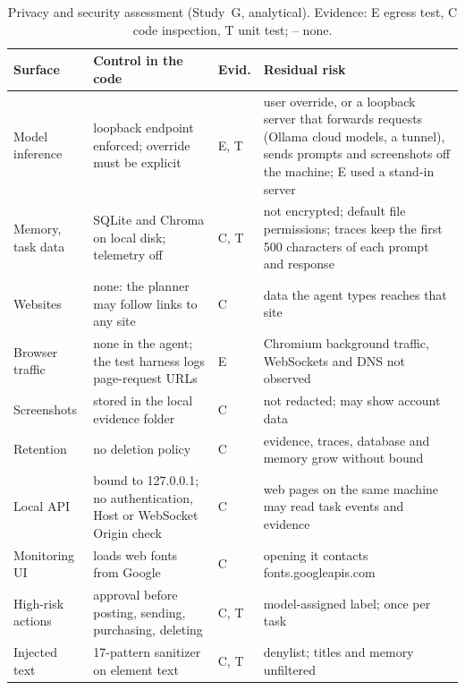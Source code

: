 \begin{table}[t]
\centering
\caption{Privacy and security assessment (Study~G, analytical). Evidence: E egress test, C code inspection, T unit test; -- none.}
\label{tab:threats}
\scriptsize
\setlength{\tabcolsep}{2pt}
\begin{tabular}{@{}p{1.55cm}p{3.05cm}p{0.6cm}p{2.95cm}@{}}
\toprule
Surface & Control in the code & Evid. & Residual risk \\
\midrule
Model inference & loopback endpoint enforced; override must be explicit & E, T & user override, or a loopback server that forwards requests (Ollama cloud models, a tunnel), sends prompts and screenshots off the machine; E used a stand-in server \\
Memory, task data & SQLite and Chroma on local disk; telemetry off & C, T & not encrypted; default file permissions; traces keep the first 500 characters of each prompt and response \\
Websites & none: the planner may follow links to any site & C & data the agent types reaches that site \\
Browser traffic & none in the agent; the test harness logs page-request URLs & E & Chromium background traffic, WebSockets and DNS not observed \\
Screenshots & stored in the local evidence folder & C & not redacted; may show account data \\
Retention & no deletion policy & C & evidence, traces, database and memory grow without bound \\
Local API & bound to 127.0.0.1; no authentication, Host or WebSocket Origin check & C & web pages on the same machine may read task events and evidence \\
Monitoring UI & loads web fonts from Google & C & opening it contacts fonts.googleapis.com \\
High-risk actions & approval before posting, sending, purchasing, deleting & C, T & model-assigned label; once per task \\
Injected text & 17-pattern sanitizer on element text & C, T & denylist; titles and memory unfiltered \\
\bottomrule
\end{tabular}
\end{table}
